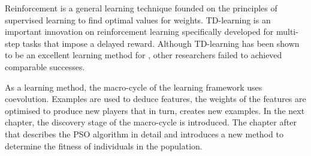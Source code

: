 Reinforcement is a general learning technique founded on the principles of supervised learning to find optimal values for weights.  TD-learning is an important innovation on reinforcement learning specifically developed for multi-step tasks that impose a delayed reward.  Although TD-learning has been shown to be an excellent learning method for , other researchers failed to achieved comparable successes. %

As a learning method, the macro-cycle of the learning framework uses coevolution.  Examples are used to deduce features, the weights of the features are optimised to produce new players that in turn, creates new examples.  In the next chapter, the discovery stage of the macro-cycle is introduced.  The chapter after that describes the PSO algorithm in detail and introduces a new method to determine the fitness of individuals in the population.   
